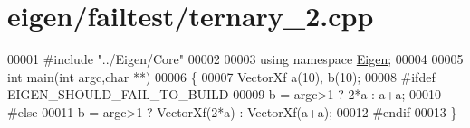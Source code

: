 \hypertarget{eigen_2failtest_2ternary__2_8cpp_source}{}\section{eigen/failtest/ternary\+\_\+2.cpp}
\label{eigen_2failtest_2ternary__2_8cpp_source}

\begin{DoxyCode}
00001 \textcolor{preprocessor}{#include "../Eigen/Core"}
00002 
00003 \textcolor{keyword}{using namespace }\hyperlink{namespace_eigen}{Eigen};
00004 
00005 \textcolor{keywordtype}{int} main(\textcolor{keywordtype}{int} argc,\textcolor{keywordtype}{char} **)
00006 \{
00007   VectorXf a(10), b(10);
00008 \textcolor{preprocessor}{#ifdef EIGEN\_SHOULD\_FAIL\_TO\_BUILD}
00009   b = argc>1 ? 2*a : a+a;
00010 \textcolor{preprocessor}{#else}
00011   b = argc>1 ? VectorXf(2*a) : VectorXf(a+a);
00012 \textcolor{preprocessor}{#endif}
00013 \}
\end{DoxyCode}
